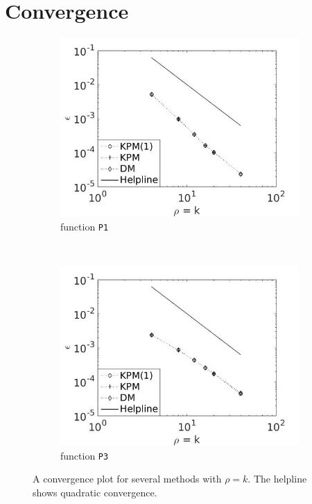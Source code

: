 \section{Convergence} \label{sec:pconv}
\begin{figure}[H]
        \centering
        \begin{subfigure}[b]{0.45\textwidth}
                \includegraphics[width=\textwidth]{fig/p1conv1}
                \caption{function \texttt{P1}}
                \label{fig:conv1p}
        \end{subfigure}%
        ~
        \begin{subfigure}[b]{0.45\textwidth}
                \includegraphics[width=\textwidth]{fig/p2conv2}
                \caption{function \texttt{P3}}
                \label{fig:conv2p}
        \end{subfigure}
        \caption{A convergence plot for several methods with $\rho = k$. The helpline shows quadratic convergence.}\label{fig:convp}
\end{figure}
